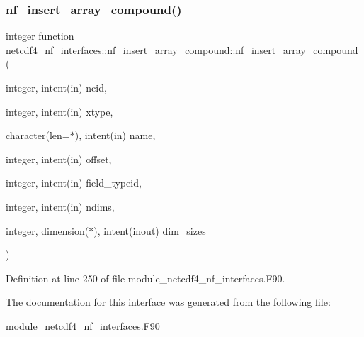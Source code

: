 \subsubsection{\texorpdfstring{nf\+\_\+insert\+\_\+array\+\_\+compound()}{nf\_insert\_array\_compound()}}
{\footnotesize\ttfamily integer function netcdf4\+\_\+nf\+\_\+interfaces\+::nf\+\_\+insert\+\_\+array\+\_\+compound\+::nf\+\_\+insert\+\_\+array\+\_\+compound (\begin{DoxyParamCaption}\item[{integer, intent(in)}]{ncid,  }\item[{integer, intent(in)}]{xtype,  }\item[{character(len=$\ast$), intent(in)}]{name,  }\item[{integer, intent(in)}]{offset,  }\item[{integer, intent(in)}]{field\+\_\+typeid,  }\item[{integer, intent(in)}]{ndims,  }\item[{integer, dimension($\ast$), intent(inout)}]{dim\+\_\+sizes }\end{DoxyParamCaption})}



Definition at line 250 of file module\+\_\+netcdf4\+\_\+nf\+\_\+interfaces.\+F90.



The documentation for this interface was generated from the following file\+:\begin{DoxyCompactItemize}
\item 
\hyperlink{module__netcdf4__nf__interfaces_8F90}{module\+\_\+netcdf4\+\_\+nf\+\_\+interfaces.\+F90}\end{DoxyCompactItemize}
